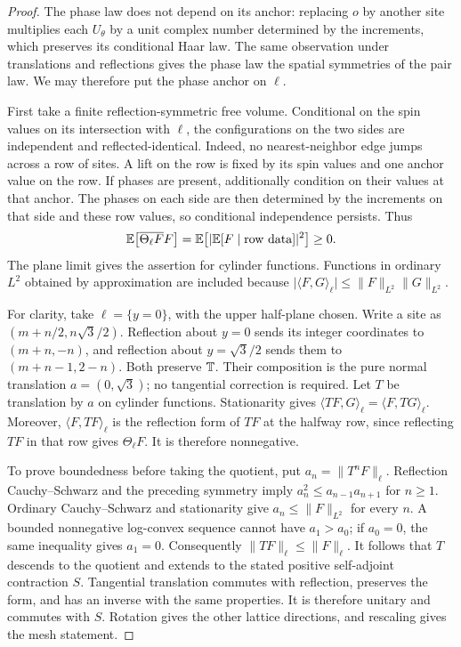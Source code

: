 \begin{proof}
The phase law does not depend on its anchor: replacing \(o\) by another site
multiplies each \(U_\theta\) by a unit complex number determined by the
increments, which preserves its conditional Haar law. The same observation
under translations and reflections gives the phase law the spatial
symmetries of the pair law. We may therefore put the phase anchor on
\(\ell\).

First take a finite reflection-symmetric free volume. Conditional on the spin
values on its intersection with \(\ell\), the configurations on the two sides
are independent and reflected-identical. Indeed, no nearest-neighbor edge
jumps across a row of sites. A lift on the row is fixed by its spin values and
one anchor value on the row. If phases are present, additionally condition on
their values at that anchor. The phases on each side are then determined by
the increments on that side and these row values, so conditional independence
persists. Thus
\[
 \mathbb E\big[\overline{\Theta_\ell F}F\big]
   =\mathbb E\big[\lvert\mathbb E[F\mid\text{row data}]\rvert^2\big]\ge0.
\]
The plane limit gives the assertion for cylinder functions. Functions in
ordinary \(L^2\) obtained by approximation are included because
\(\lvert\langle F,G\rangle_\ell\rvert\le
\|F\|_{L^2}\|G\|_{L^2}\).

For clarity, take \(\ell=\{y=0\}\), with the upper half-plane chosen. Write a
site as \((m+n/2,n\sqrt3/2)\). Reflection about \(y=0\) sends its integer
coordinates to \((m+n,-n)\), and reflection about \(y=\sqrt3/2\) sends them to
\((m+n-1,2-n)\). Both preserve \(\mathbb T\). Their composition is the pure normal
translation \(a=(0,\sqrt3)\); no tangential correction is required.
Let \(T\) be translation by \(a\) on cylinder functions. Stationarity gives
\(\langle TF,G\rangle_\ell=\langle F,TG\rangle_\ell\). Moreover,
\(\langle F,TF\rangle_\ell\) is the reflection form of \(TF\) at the halfway
row, since reflecting \(TF\) in that row gives \(\Theta_\ell F\). It is
therefore nonnegative.

To prove boundedness before taking the quotient, put
\(a_n=\|T^nF\|_\ell\). Reflection Cauchy--Schwarz and the preceding symmetry
imply \(a_n^2\le a_{n-1}a_{n+1}\) for \(n\ge1\). Ordinary Cauchy--Schwarz
and stationarity give \(a_n\le\|F\|_{L^2}\) for every \(n\). A bounded
nonnegative log-convex sequence cannot have \(a_1>a_0\); if \(a_0=0\), the
same inequality gives \(a_1=0\). Consequently \(\|TF\|_\ell\le\|F\|_\ell\).
It follows that \(T\) descends to the quotient and extends to the stated
positive self-adjoint contraction \(S\). Tangential translation commutes with
reflection, preserves the form, and has an inverse with the same properties.
It is therefore unitary and commutes with \(S\). Rotation gives the other
lattice directions, and rescaling gives the mesh statement.
\end{proof}

